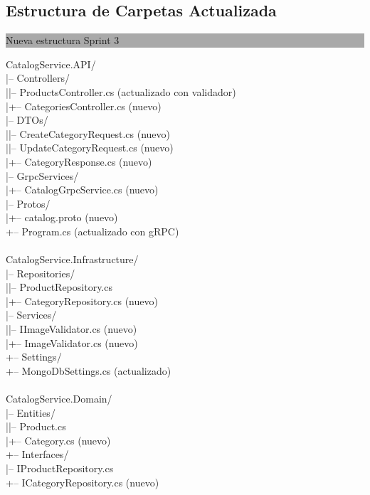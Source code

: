 \documentclass[12pt,a4paper]{article}
\newcommand{\codeblock}[2]{%
  \vspace{4pt}%
  \noindent\colorbox{darkgray}{\parbox{\dimexpr\textwidth-2\fboxsep}{%
    \bfseries\small\color{white}\strut\quad #1}}%
  \begin{codeframe}%
  {\color{codetext}\ttfamily\small\sloppy%
  \setlength{\parindent}{0pt}%
  #2}%
  \end{codeframe}%
  \vspace{4pt}%
}
\begin{document}
\newpage

\subsection{Estructura de Carpetas Actualizada}

\codeblock{Nueva estructura Sprint 3}{%
CatalogService.API/\\
\quad|-- Controllers/\\
\quad|\quad\quad|-- ProductsController.cs (actualizado con validador)\\
\quad|\quad\quad+-- CategoriesController.cs (nuevo)\\
\quad|-- DTOs/\\
\quad|\quad\quad|-- CreateCategoryRequest.cs (nuevo)\\
\quad|\quad\quad|-- UpdateCategoryRequest.cs (nuevo)\\
\quad|\quad\quad+-- CategoryResponse.cs (nuevo)\\
\quad|-- GrpcServices/\\
\quad|\quad\quad+-- CatalogGrpcService.cs (nuevo)\\
\quad|-- Protos/\\
\quad|\quad\quad+-- catalog.proto (nuevo)\\
\quad+-- Program.cs (actualizado con gRPC)\\
\\
CatalogService.Infrastructure/\\
\quad|-- Repositories/\\
\quad|\quad\quad|-- ProductRepository.cs\\
\quad|\quad\quad+-- CategoryRepository.cs (nuevo)\\
\quad|-- Services/\\
\quad|\quad\quad|-- IImageValidator.cs (nuevo)\\
\quad|\quad\quad+-- ImageValidator.cs (nuevo)\\
\quad+-- Settings/\\
\quad\quad\quad+-- MongoDbSettings.cs (actualizado)\\
\\
CatalogService.Domain/\\
\quad|-- Entities/\\
\quad|\quad\quad|-- Product.cs\\
\quad|\quad\quad+-- Category.cs (nuevo)\\
\quad+-- Interfaces/\\
\quad\quad\quad|-- IProductRepository.cs\\
\quad\quad\quad+-- ICategoryRepository.cs (nuevo)%
}
\end{document}
